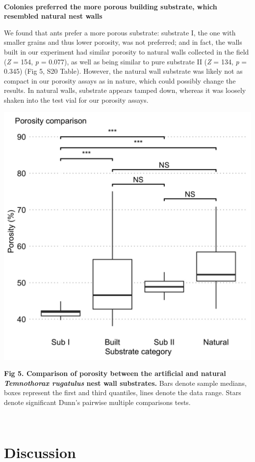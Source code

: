 \documentclass[3p]{elsarticle} %
\begin{document}
~

\textbf{Colonies preferred the more porous building substrate, which
resembled natural nest walls}

We found that ants prefer a more porous substrate: substrate I, the one
with smaller grains and thus lower porosity, was not preferred; and in
fact, the walls built in our experiment had similar porosity to natural
walls collected in the field (\emph{Z} = 154, \emph{p} = 0.077), as well
as being similar to pure substrate II (\emph{Z} = 134, \emph{p} = 0.345)
(Fig 5, S20 Table). However, the natural wall substrate was likely not
as compact in our porosity assays as in nature, which could possibly
change the results. In natural walls, substrate appears tamped down,
whereas it was loosely shaken into the test vial for our porosity
assays.

\begin{flushleft}\includegraphics[width=0.67\linewidth,height=0.5\textheight]{../figures/Fig5} \end{flushleft}

\textbf{Fig 5. Comparison of porosity between the artificial and natural
\emph{Temnothorax rugatulus} nest wall substrates.} Bars denote sample
medians, boxes represent the first and third quantiles, lines denote the
data range. Stars denote significant Dunn's pairwise multiple
comparisons tests.

~

\hypertarget{discussion}{%
\section{Discussion}\label{discussion}}
\end{document}
